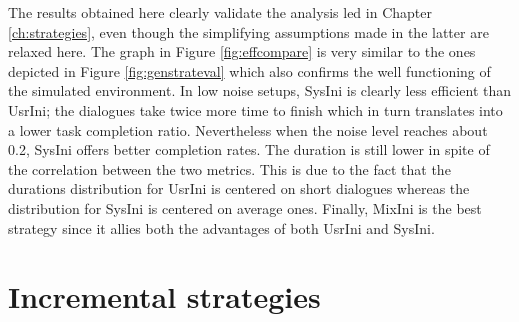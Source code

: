         The results obtained here clearly validate the analysis led in Chapter \ref{ch:strategies}, even though the simplifying assumptions made in the latter are relaxed here. The graph in Figure \ref{fig:effcompare} is very similar to the ones depicted in Figure \ref{fig:genstrateval} which also confirms the well functioning of the simulated environment. In low noise setups, SysIni is clearly less efficient than UsrIni; the dialogues take twice more time to finish which in turn translates into a lower task completion ratio. Nevertheless when the noise level reaches about 0.2, SysIni offers better completion rates. The duration is still lower in spite of the correlation between the two metrics. This is due to the fact that the durations distribution for UsrIni is centered on short dialogues whereas the distribution for SysIni is centered on average ones. Finally, MixIni is the best strategy since it allies both the advantages of both UsrIni and SysIni.
        
\section{Incremental strategies}

    
		

